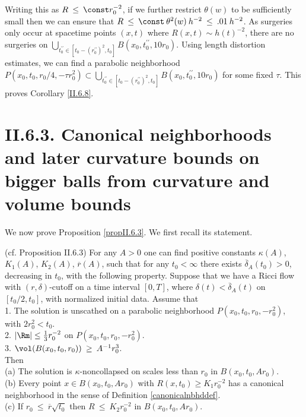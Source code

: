 Writing this as
$R \: \le \: \const r_0^{-2}$,
if we further restrict $\theta(w)$ to be sufficiently
small then we can ensure that $R \: \le \: \const \: \theta^2(w) \: h^{-2}
\: \le \: .01 \: h^{-2}$. As surgeries only occur
at spacetime points $(x,t)$ where
$R(x,t) \sim h(t)^{-2}$,
there are no surgeries on
$\bigcup_{t_0^{\prime \prime} \in
[t_0 - (r_0^{\prime \prime})^2, t_0]} B(x_0, t_0^{\prime \prime}, 10 r_0)$.
Using length distortion estimates,
we can find a parabolic neighborhood
$P(x_0, t_0, r_0/4, - \tau r_0^2) \subset
\bigcup_{t_0^{\prime \prime} \in
[t_0 - (r_0^{\prime \prime})^2, t_0]} B(x_0, t_0^{\prime \prime}, 10 r_0)$
for some fixed $\tau$.
This proves Corollary \ref{II.6.8}.





\section{II.6.3. Canonical neighborhoods and later curvature bounds on bigger balls from
curvature and volume bounds}
We now prove Proposition \ref{propII.6.3}.
We first recall its statement.
\begin{proposition}
  \label{prop:kl-canonical-neighborhoods-later-curvature-bounds-bigger-balls-from-curvatu-existence-canonical-neighborhoods}

(cf. Proposition II.6.3)
For any $A > 0$ one can find positive constants $\kappa(A)$, $K_1(A)$, $K_2(A)$,
$\overline{r}(A)$,
such that for any $t_0 < \infty$
there exists $\overline{\delta}_{A}(t_0)
> 0$, decreasing in $t_0$, with the following property.  Suppose that
we have a Ricci flow with $(r, \delta)$-cutoff on a time interval
$[0, T]$, where $\delta(t) < \overline{\delta}_A(t)$ on $[t_0/2, t_0]$, with
normalized initial data.  Assume that \\
1. The solution is unscathed on a parabolic neighborhood
$P(x_0, t_0, r_0, -r_0^2)$, with $2r_0^2 < t_0$. \\
2.
$|\Rm| \le \frac13 r_0^{-2}$
on $P(x_0, t_0, r_0, -r_0^2)$. \\
3. $\vol(B(x_0, t_0, r_0)) \: \ge \: A^{-1} r_0^3$.\\

Then\\
(a) The solution is $\kappa$-noncollapsed on scales less than $r_0$
in $B(x_0, t_0, Ar_0)$.\\
(b) Every point $x \in B(x_0, t_0, Ar_0)$ with $R(x, t_0) \ge K_1 r_0^{-2}$
has a canonical neighborhood in the sense of
Definition \ref{canonicalnbhddef}.\\
(c) If $r_0 \: \le \: \overline{r} \sqrt{t_0}$ then $R \: \le \: K_2
r_0^{-2}$ in $B(x_0, t_0, Ar_0)$.
\end{proposition}
